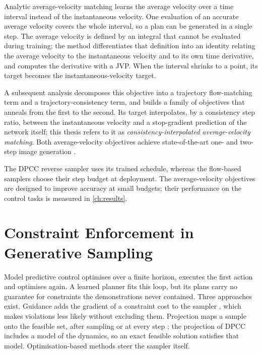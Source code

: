 \documentclass[headsepline,footsepline,footinclude=false,oneside,fontsize=11pt,paper=a4,listof=totoc,bibliography=totoc]{scrbook}
\theoremstyle{definition}
\theoremstyle{plain}
\theoremstyle{remark}
\begin{document}
Analytic average-velocity matching \parencite{geng2025meanflow} learns the average velocity over a
time interval instead of the instantaneous velocity. One evaluation of an accurate average velocity covers the whole interval, so a
plan can be generated in a single step. The average velocity is defined by an integral that cannot be
evaluated during training; the method differentiates that definition into an identity relating the
average velocity to the instantaneous velocity and to its own time derivative, and computes the
derivative with a \ac{JVP}. When the interval shrinks to a point, its target becomes the
instantaneous-velocity target.

A subsequent analysis \parencite{zhang2025alphaflow} decomposes this objective into a
trajectory flow-matching term and a trajectory-consistency term, and builds a family of objectives
that anneals from the first to the second. Its target interpolates, by a consistency step ratio,
between the instantaneous velocity and a stop-gradient prediction of the network itself; this thesis
refers to it as \emph{consistency-interpolated average-velocity matching}. Both average-velocity
objectives achieve state-of-the-art one- and two-step image generation
\parencite{geng2025meanflow,zhang2025alphaflow}.

The DPCC reverse sampler uses its trained schedule, whereas the flow-based samplers choose their
step budget at deployment. The average-velocity objectives are designed to improve accuracy at
small budgets; their performance on the control tasks is measured in \autoref{ch:results}.

\section{Constraint Enforcement in Generative Sampling}\label{sec:bg:mpc}

Model predictive control \parencite{morari1999model} optimises over a finite horizon, executes the
first action and optimises again. A learned planner fits this loop, but its plans carry no guarantee
for constraints the demonstrations never contained. Three approaches exist. Guidance adds the gradient
of a constraint cost to the sampler \parencite{carvalho2025motion}, which makes violations less likely
without excluding them. Projection maps a sample onto the feasible set, after sampling
\parencite{power2023sampling} or at every step \parencite{christopher2024constrained,romer2025diffusion};
the projection of \ac{DPCC} includes a model of the dynamics, so an exact feasible solution satisfies
that model. Optimisation-based methods steer the sampler itself.
\end{document}
